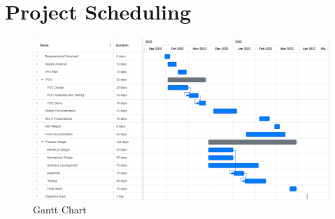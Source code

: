 \documentclass[titlepage]{article}
\begin{document}
\section{Project Scheduling}

\begin{figure} [H]
\begin{center}
	\includegraphics [width=1\textwidth] {Figures/Gantt.pdf}
	\caption{Gantt Chart}
	\label{fig:Gantt}
	\end{center}
\end{figure}
\end{document}
